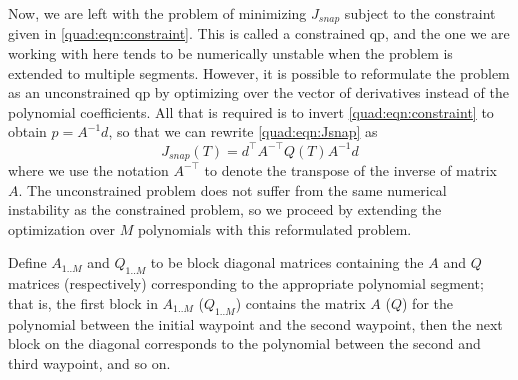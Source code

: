 Now, we are left with the problem of minimizing $J_{snap}$ subject to the constraint given in \autoref{quad:eqn:constraint}. This is called a constrained \gls{qp}, and the one we are working with here tends to be numerically unstable when the problem is extended to multiple segments. However, it is possible to reformulate the problem as an unconstrained \gls{qp} by optimizing over the vector of derivatives instead of the polynomial coefficients. All that is required is to invert \autoref{quad:eqn:constraint} to obtain $p = A^{-1}d$, so that we can rewrite \autoref{quad:eqn:Jsnap} as
\begin{equation}
    J_{snap}(T) = d^\top A^{-\top} Q(T) A^{-1}d
\label{quad:eqn:Jsnap2}
\end{equation}
where we use the notation $A^{-\top}$ to denote the transpose of the inverse of matrix $A$. The unconstrained problem does not suffer from the same numerical instability as the constrained problem, so we proceed by extending the optimization over $M$ polynomials with this reformulated problem.

Define $A_{1..M}$ and $Q_{1..M}$ to be block diagonal matrices containing the $A$ and $Q$ matrices (respectively) corresponding to the appropriate polynomial segment; that is, the first block in $A_{1..M}$ ($Q_{1..M}$) contains the matrix $A$ ($Q$) for the polynomial between the initial waypoint and the second waypoint, then the next block on the diagonal corresponds to the polynomial between the second and third waypoint, and so on.

